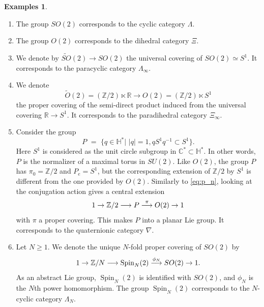 \documentclass[english,11pt,leqno]{article}
\def\CC{\mathbb{C}}
\def\HH{\mathbb{H}}
\def\RR{\mathbb{R}}
\def\ZZ{\mathbb{Z}}
\def\on{\operatorname}
\def\lra{\longrightarrow}
\theoremstyle{definition}
\newtheorem{exas}[thm]{Examples}
\theoremstyle{remark}
\numberwithin{equation}{section}
\begin{document}
\begin{exas}\label{ex:planar}
    \begin{enumerate}[label=(\alph*)]
	    \item The group $SO(2)$ corresponds to the cyclic category $\Lambda$. 
	    \item The group $O(2)$ corresponds to the dihedral category $\Xi$. 
	    \item We denote by $\widetilde{SO}(2)\to SO(2)$ the universal covering of $SO(2)\simeq S^1$.
		It corresponds to the paracyclic category $\Lambda_\infty$.
	    \item We denote 
		   \[
		   \widetilde O(2) = (\ZZ/2)\ltimes \RR \lra O(2) = (\ZZ/2)\ltimes S^1
		   \]
		   the proper covering  of the semi-direct product induced from the universal covering $\RR\to S^1$.
		   It corresponds to the paradihedral category $\Xi_\infty$. 
	   \item Consider the group
		     \[
		  P \,\,=\,\,\bigl\{ q\in\HH^* \bigl| \,\, |q|=1, q S^1 q^{-1} \subset S^1 \bigr\}.
		  \]
		  Here $S^1$ is considered as the unit circle subgroup in $\CC^*\subset\HH^*$.
		   In other words, $P$ is the normalizer of a maximal torus in $SU(2)$. 
		   Like $O(2)$, the group $P$ has  $\pi_0=\ZZ/2$ and  $P_e= S^1$, but the
		   corresponding
		  extension of $\ZZ/2$ by $S^1$  is different from the one provided by $O(2)$. 
		  Similarly to \eqref{eq:p_n},  looking at the conjugation action gives a central extension
		   \[
		   1\to \ZZ/2\lra P \buildrel \pi \over \lra O(2)\to 1
		   \]
		   with $\pi$ a proper covering. This makes  $P$ into a planar Lie group.
		   It corresponds to the quaternionic category $\nabla$. 

	   \item Let $N\geq 1$. We denote the unique $N$-fold proper covering of $SO(2)$ by 
		   \[
		   1\to \ZZ/N \lra \on{Spin}_N(2)\buildrel \phi_N\over \lra SO(2) \to 1.
		   \]
		  As an abstract Lie group, $\on{Spin}_N(2)$ is identified with $SO(2)$, and $\phi_N$
		  is the $N$th power homomorphism. The group $\on{Spin}_N(2)$ corresponds to the
		  $N$-cyclic category $\Lambda_N$.


\end{enumerate}
\end{exas}
\end{document}
